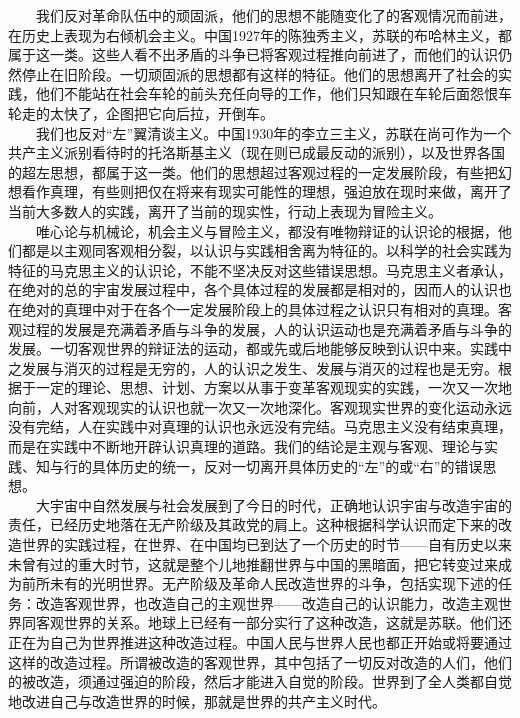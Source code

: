 \documentclass[cn,11pt,chinese]{elegantbook}
\begin{document}
　　我们反对革命队伍中的顽固派，他们的思想不能随变化了的客观情况而前进，在历史上表现为右倾机会主义。中国1927年的陈独秀主义，苏联的布哈林主义，都属于这一类。这些人看不出矛盾的斗争已将客观过程推向前进了，而他们的认识仍然停止在旧阶段。一切顽固派的思想都有这样的特征。他们的思想离开了社会的实践，他们不能站在社会车轮的前头充任向导的工作，他们只知跟在车轮后面怨恨车轮走的太快了，企图把它向后拉，开倒车。\\
　　我们也反对“左”翼清谈主义。中国1930年的李立三主义，苏联在尚可作为一个共产主义派别看待时的托洛斯基主义（现在则已成最反动的派别），以及世界各国的超左思想，都属于这一类。他们的思想超过客观过程的一定发展阶段，有些把幻想看作真理，有些则把仅在将来有现实可能性的理想，强迫放在现时来做，离开了当前大多数人的实践，离开了当前的现实性，行动上表现为冒险主义。\\
　　唯心论与机械论，机会主义与冒险主义，都没有唯物辩证的认识论的根据，他们都是以主观同客观相分裂，以认识与实践相舍离为特征的。以科学的社会实践为特征的马克思主义的认识论，不能不坚决反对这些错误思想。马克思主义者承认，在绝对的总的宇宙发展过程中，各个具体过程的发展都是相对的，因而人的认识也在绝对的真理中对于在各个一定发展阶段上的具体过程之认识只有相对的真理。客观过程的发展是充满着矛盾与斗争的发展，人的认识运动也是充满着矛盾与斗争的发展。一切客观世界的辩证法的运动，都或先或后地能够反映到认识中来。实践中之发展与消灭的过程是无穷的，人的认识之发生、发展与消灭的过程也是无穷。根据于一定的理论、思想、计划、方案以从事于变革客观现实的实践，一次又一次地向前，人对客观现实的认识也就一次又一次地深化。客观现实世界的变化运动永远没有完结，人在实践中对真理的认识也永远没有完结。马克思主义没有结束真理，而是在实践中不断地开辟认识真理的道路。我们的结论是主观与客观、理论与实践、知与行的具体历史的统一，反对一切离开具体历史的“左”的或“右”的错误思想。\\
　　大宇宙中自然发展与社会发展到了今日的时代，正确地认识宇宙与改造宇宙的责任，已经历史地落在无产阶级及其政党的肩上。这种根据科学认识而定下来的改造世界的实践过程，在世界、在中国均已到达了一个历史的时节——自有历史以来未曾有过的重大时节，这就是整个儿地推翻世界与中国的黑暗面，把它转变过来成为前所未有的光明世界。无产阶级及革命人民改造世界的斗争，包括实现下述的任务：改造客观世界，也改造自己的主观世界——改造自己的认识能力，改造主观世界同客观世界的关系。地球上已经有一部分实行了这种改造，这就是苏联。他们还正在为自己为世界推进这种改造过程。中国人民与世界人民也都正开始或将要通过这样的改造过程。所谓被改造的客观世界，其中包括了一切反对改造的人们，他们的被改造，须通过强迫的阶段，然后才能进入自觉的阶段。世界到了全人类都自觉地改进自己与改造世界的时候，那就是世界的共产主义时代。\\
\end{document}
